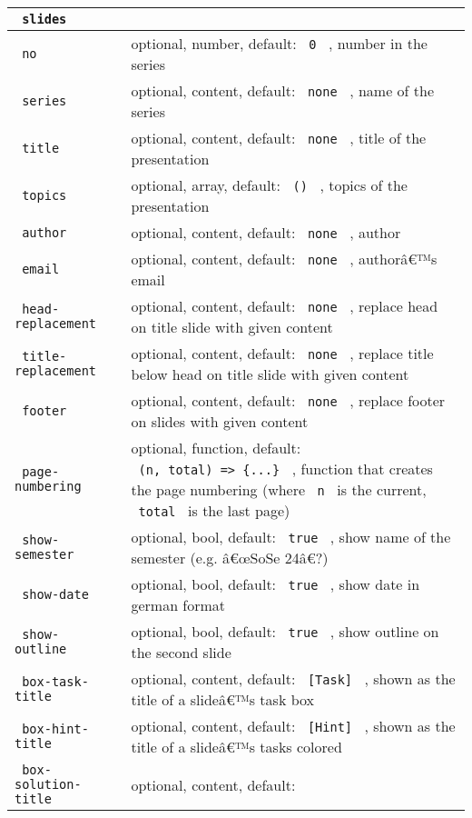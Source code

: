 \begin{longtable}[]{@{}ll@{}}
\toprule\noalign{}
\texttt{\ slides\ } & \\
\midrule\noalign{}
\endhead
\bottomrule\noalign{}
\endlastfoot
\texttt{\ no\ } & optional, number, default: \texttt{\ 0\ } , number in
the series \\
\texttt{\ series\ } & optional, content, default: \texttt{\ none\ } ,
name of the series \\
\texttt{\ title\ } & optional, content, default: \texttt{\ none\ } ,
title of the presentation \\
\texttt{\ topics\ } & optional, array, default: \texttt{\ ()\ } , topics
of the presentation \\
\texttt{\ author\ } & optional, content, default: \texttt{\ none\ } ,
author \\
\texttt{\ email\ } & optional, content, default: \texttt{\ none\ } ,
authorâ€™s email \\
\texttt{\ head-replacement\ } & optional, content, default:
\texttt{\ none\ } , replace head on title slide with given content \\
\texttt{\ title-replacement\ } & optional, content, default:
\texttt{\ none\ } , replace title below head on title slide with given
content \\
\texttt{\ footer\ } & optional, content, default: \texttt{\ none\ } ,
replace footer on slides with given content \\
\texttt{\ page-numbering\ } & optional, function, default:
\texttt{\ (n,\ total)\ =\textgreater{}\ \{...\}\ } , function that
creates the page numbering (where \texttt{\ n\ } is the current,
\texttt{\ total\ } is the last page) \\
\texttt{\ show-semester\ } & optional, bool, default: \texttt{\ true\ }
, show name of the semester (e.g. â€œSoSe 24â€?) \\
\texttt{\ show-date\ } & optional, bool, default: \texttt{\ true\ } ,
show date in german format \\
\texttt{\ show-outline\ } & optional, bool, default: \texttt{\ true\ } ,
show outline on the second slide \\
\texttt{\ box-task-title\ } & optional, content, default:
\texttt{\ {[}Task{]}\ } , shown as the title of a slideâ€™s task box \\
\texttt{\ box-hint-title\ } & optional, content, default:
\texttt{\ {[}Hint{]}\ } , shown as the title of a slideâ€™s tasks
colored \\
\texttt{\ box-solution-title\ } & optional, content, default:

\end{longtable}
